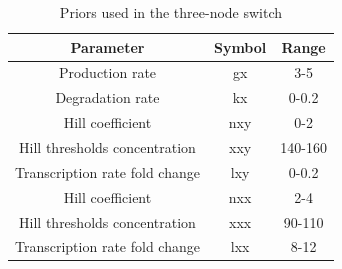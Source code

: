 {\begin{table}[htpb]
\centering
\caption{Priors used in the three-node switch}
\label{tab:multi_priors}
\begin{tabular}{@{}ccc@{}}
\toprule
Parameter                           & Symbol & Range   \\ \midrule
Production rate                & gx        & 3-5    \\
Degradation rate               & kx        & 0-0.2     \\
Hill coefficient               & nxy       & 0-2    \\
Hill thresholds concentration  & xxy       & 140-160 \\
Transcription rate fold change & lxy       & 0-0.2     \\
Hill coefficient               & nxx       & 2-4     \\
Hill thresholds concentration  & xxx       & 90-110  \\
Transcription rate fold change & lxx       & 8-12    \\ \bottomrule
\end{tabular}
\end{table}


}
